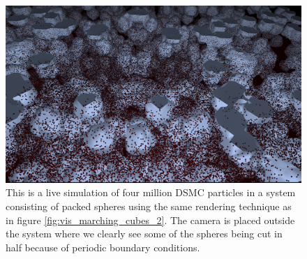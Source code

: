 \begin{figure}[htb]
\begin{center}
\includegraphics[width=\textwidth, trim=0cm 0cm 0cm 0cm, clip]{visualization/figures/marching_cubes_spheres_2.png}
\end{center}
\caption{This is a live simulation of four million DSMC particles in a system consisting of packed spheres using the same rendering technique as in figure \ref{fig:vis_marching_cubes_2}. The camera is placed outside the system where we clearly see some of the spheres being cut in half because of periodic boundary conditions. }
\label{fig:vis_marching_cubes_3}
\end{figure}

